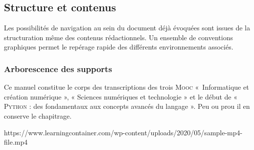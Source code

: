 \subsection*{Structure et contenus}

Les possibilités de navigation au sein du document déjà évoquées sont issues de la structuration même des contenus rédactionnels. Un ensemble de conventions graphiques permet le repérage rapide des différents environnements associés. 

\subsubsection*{Arborescence des supports}

Ce manuel constitue le corps des transcriptions des trois \textsc{Mooc} «~Informatique et création numérique », « Sciences numériques et technologie » et le début de « \textsc{Python} : des fondamentaux aux concepts avancés du langage ». Peu ou prou il en conserve le chapitrage.

\setcounter{video}{-1}
\begin{marginvideo*}%
		{https://www.learningcontainer.com/wp-content/uploads/2020/05/sample-mp4-file.mp4}%
\end{marginvideo*}


